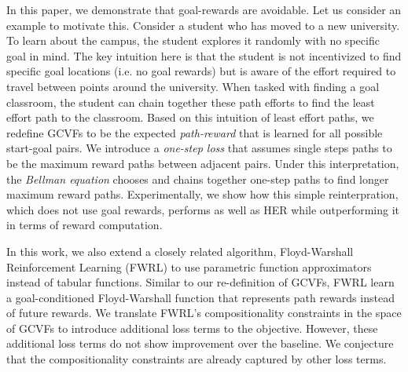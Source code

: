 
%
In this paper, we demonstrate that goal-rewards are 
avoidable. Let us consider an example to motivate this. Consider a student who has moved
to a new university. To learn about the campus, the student explores it
randomly with no specific goal in mind. The key intuition here is that
the student is not incentivized to find specific goal locations (i.e.
no goal rewards) but is aware of the effort required to travel between
points around the university. When tasked with
finding a goal classroom, the student can chain together these
path efforts to find the least effort path to the
classroom. 
%
Based on this intuition of least effort paths, we redefine GCVFs to be
the expected \emph{path-reward} that is learned for all possible
start-goal pairs. We  
introduce a \emph{one-step loss} that assumes single steps paths 
to be the maximum reward paths between adjacent pairs.
Under this interpretation, the \emph{Bellman equation} chooses and chains
together one-step paths to find longer maximum reward paths. 
%
Experimentally, we show how this simple reinterpration, which does not use goal
rewards, performs as well as HER while outperforming it in terms of
reward computation.

In this work, we also extend a closely related algorithm, Floyd-Warshall Reinforcement
Learning (FWRL) \citep{dhiman2018floydwarshall} to use parametric
function approximators instead of tabular functions. Similar to our
re-definition of GCVFs, FWRL learn a goal-conditioned Floyd-Warshall function
that represents path rewards instead of future rewards.
We translate FWRL's compositionality constraints in the space of GCVFs to introduce
additional loss terms to the objective. However, these additional loss
terms do not show improvement over the baseline. We conjecture that the
compositionality constraints are already captured by other loss terms. 

